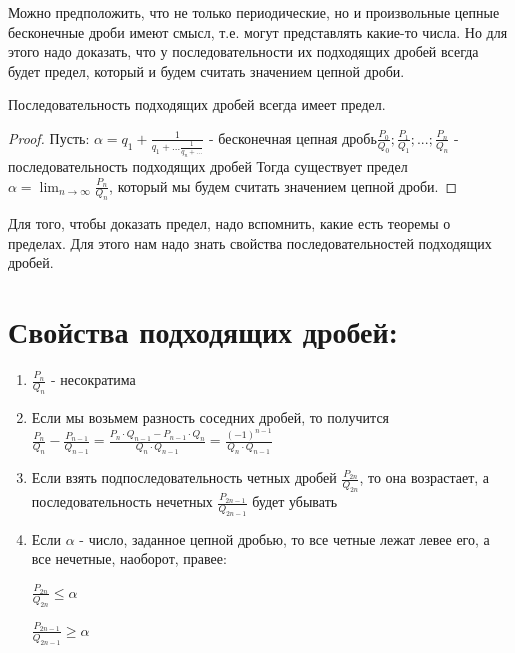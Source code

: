 \documentclass[russian]{lecture-notes}
\begin{document}
	Можно предположить, что не только периодические, но и произвольные цепные бесконечные дроби имеют смысл, т.е. могут представлять какие-то числа. Но для этого надо доказать, что у последовательности их подходящих дробей всегда будет предел, который и будем считать значением цепной дроби.

	\begin{theorem}
		Последовательность подходящих дробей всегда имеет предел.
	\end{theorem}
	\begin{proof}
		Пусть: $\alpha = q_1+\frac{1}{q_1+...\frac{1}{q_n+...}}$ - бесконечная цепная дробь\newline $\frac{P_0}{Q_0};\frac{P_1}{Q_1};...;\frac{P_n}{Q_n}$ - последовательность подходящих дробей\vspace{1mm}\newline
		Тогда существует предел $\alpha=\lim_{n\to \infty} \frac{P_n}{Q_n}$, который мы будем считать значением цепной дроби.\vspace{3mm}\newline
	\end{proof}
	
	Для того, чтобы доказать предел, надо вспомнить, какие есть теоремы о пределах. Для этого нам надо знать свойства последовательностей подходящих дробей.
	
	\section*{Свойства подходящих дробей:}
	\begin{enumerate}
		\item {$\frac{P_n}{Q_n}$ - несократима}
		
		\item {Если мы возьмем разность соседних дробей, то получится $\frac{P_n}{Q_n}-\frac{P_{n-1}}{Q_{n-1}}=\frac{P_n\cdot Q_{n-1}-P_{n-1}\cdot Q_n}{Q_n\cdot Q_{n-1}}=\frac{(-1)^{n-1}}{Q_n\cdot Q_{n-1}}$}
		
		\item {Если взять подпоследовательность четных дробей $\frac{P_{2n}}{Q_{2n}}$, то она возрастает, а последовательность нечетных $\frac{P_{2n-1}}{Q_{2n-1}}$ будет убывать}
		
		\item {Если $\alpha$ - число, заданное цепной дробью, то все четные лежат левее его, а все нечетные, наоборот, правее:
			
		$\frac{P_{2n}}{Q_{2n}}\leq \alpha $
		
		$\frac{P_{2n-1}}{Q_{2n-1}} \geq \alpha$}
	\end{enumerate}
\end{document}
